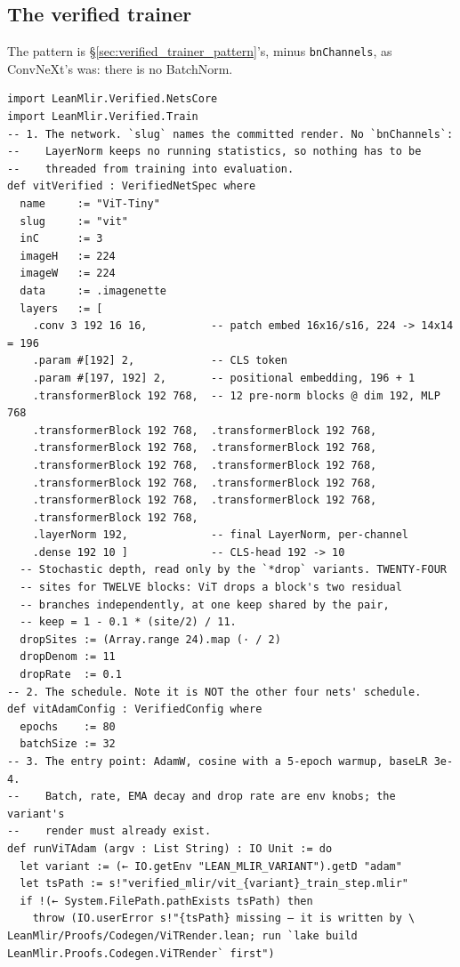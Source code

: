 \subsection*{The verified trainer}

The pattern is \S\ref{sec:verified_trainer_pattern}'s, minus
\texttt{bnChannels}, as ConvNeXt's was: there is no BatchNorm.

\begin{verbatim}
import LeanMlir.Verified.NetsCore
import LeanMlir.Verified.Train
-- 1. The network. `slug` names the committed render. No `bnChannels`:
--    LayerNorm keeps no running statistics, so nothing has to be
--    threaded from training into evaluation.
def vitVerified : VerifiedNetSpec where
  name     := "ViT-Tiny"
  slug     := "vit"
  inC      := 3
  imageH   := 224
  imageW   := 224
  data     := .imagenette
  layers   := [
    .conv 3 192 16 16,          -- patch embed 16x16/s16, 224 -> 14x14 = 196
    .param #[192] 2,            -- CLS token
    .param #[197, 192] 2,       -- positional embedding, 196 + 1
    .transformerBlock 192 768,  -- 12 pre-norm blocks @ dim 192, MLP 768
    .transformerBlock 192 768,  .transformerBlock 192 768,
    .transformerBlock 192 768,  .transformerBlock 192 768,
    .transformerBlock 192 768,  .transformerBlock 192 768,
    .transformerBlock 192 768,  .transformerBlock 192 768,
    .transformerBlock 192 768,  .transformerBlock 192 768,
    .transformerBlock 192 768,
    .layerNorm 192,             -- final LayerNorm, per-channel
    .dense 192 10 ]             -- CLS-head 192 -> 10
  -- Stochastic depth, read only by the `*drop` variants. TWENTY-FOUR
  -- sites for TWELVE blocks: ViT drops a block's two residual
  -- branches independently, at one keep shared by the pair,
  -- keep = 1 - 0.1 * (site/2) / 11.
  dropSites := (Array.range 24).map (· / 2)
  dropDenom := 11
  dropRate  := 0.1
-- 2. The schedule. Note it is NOT the other four nets' schedule.
def vitAdamConfig : VerifiedConfig where
  epochs    := 80
  batchSize := 32
-- 3. The entry point: AdamW, cosine with a 5-epoch warmup, baseLR 3e-4.
--    Batch, rate, EMA decay and drop rate are env knobs; the variant's
--    render must already exist.
def runViTAdam (argv : List String) : IO Unit := do
  let variant := (← IO.getEnv "LEAN_MLIR_VARIANT").getD "adam"
  let tsPath := s!"verified_mlir/vit_{variant}_train_step.mlir"
  if !(← System.FilePath.pathExists tsPath) then
    throw (IO.userError s!"{tsPath} missing — it is written by \
LeanMlir/Proofs/Codegen/ViTRender.lean; run `lake build LeanMlir.Proofs.Codegen.ViTRender` first")

\end{verbatim}
